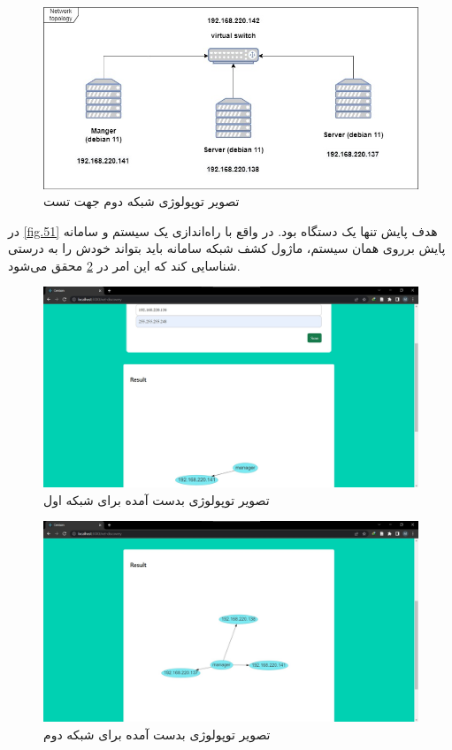 \begin{figure}[!h]
    \centering\includegraphics[scale=.55]{./topo-test2}
    \caption{تصویر توپولوژی شبکه دوم جهت تست}\label{fig.52}
\end{figure}


در \cref{fig.51} هدف پایش تنها یک دستگاه بود. در واقع با راه‌اندازی یک سیستم و سامانه پایش برروی همان سیستم، ماژول کشف شبکه سامانه باید بتواند خودش را به درستی شناسایی کند که این امر در \cref{fig.511} محقق می‌شود. 


\begin{figure}[!h]
    \centering\includegraphics[scale=.38]{./topo-test1-result}
    \caption{تصویر توپولوژی بدست آمده برای شبکه اول}\label{fig.511}
\end{figure}


\begin{figure}[!h]
    \centering\includegraphics[scale=.38]{./topo-test2-result}
    \caption{تصویر توپولوژی بدست آمده برای شبکه دوم}\label{fig.521}
\end{figure}


